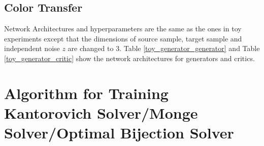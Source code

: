 \documentclass[runningheads]{llncs}
\begin{document}
\subsection{Color Transfer}
\label{hyperparameters_color_transfer}

Network Architectures and hyperparameters are the same as the ones in toy experiments except that the dimensions of source sample, target sample and independent noise $z$ are changed to 3. Table \ref{toy_generator_generator} and Table \ref{toy_generator_critic} show the network architectures for generators and critics.

\clearpage

\section{Algorithm for Training Kantorovich Solver/Monge Solver/Optimal Bijection Solver}
\end{document}
